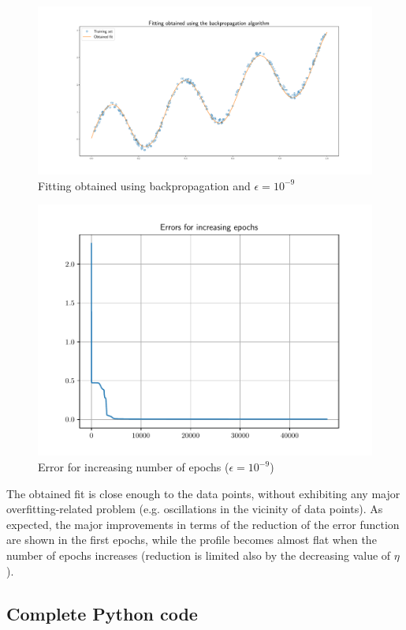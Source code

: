 \documentclass[letterpaper,headings=standardclasses]{scrartcl}
\begin{document}
\begin{figure}[h]
\centering
\includegraphics[width=\linewidth]{fit_9.pdf}
\caption{Fitting obtained using backpropagation and $\epsilon = 10^{-9}$}
\label{fit_9}
\end{figure}

\begin{figure}[h]
\centering
\includegraphics[width=.7\linewidth]{err_9.pdf}
\caption{Error for increasing number of epochs ($\epsilon = 10^{-9}$)}
\label{err_9}
\end{figure}

The obtained fit is close enough to the data points, without exhibiting any major overfitting-related problem (e.g. oscillations in the vicinity of data points). As expected, the major improvements in terms of the reduction of the error function are shown in the first epochs, while the profile becomes almost flat when the number of epochs increases (reduction is limited also by the decreasing value of $\eta$).

\subsection{Complete Python code}


\end{document}
